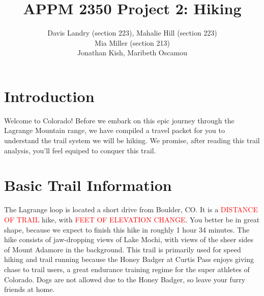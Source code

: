 \documentclass[12pt]{article}   %
\theoremstyle{definition}
\numberwithin{equation}{section}
\begin{document}
\parskip10pt
\parindent0pt
\baselineskip15pt
\doublespacing

\title{APPM 2350 Project 2: Hiking}
\author{Davis Landry (section 223), Mahalie Hill (section 223)\\Mia Miller (section 213) \\ Jonathan Kish, Maribeth Oscamou}

\pagestyle{fancy}
\renewcommand{\sectionmark}[1]{\markright{#1}{}}

\fancyhf{}

\rhead{\fancyplain{}{\thepage}} %
\lhead{\fancyplain{}{\rightmark }} %

\maketitle
\newpage
\tableofcontents
\newpage
\newpage
\lhead{]Landry, Hill, Miller Project 1}

\section{Introduction} \label{APPM2350proj01sec01}

\quad Welcome to Colorado! Before we embark on this epic journey through the Lagrange Mountain range, we have compiled a travel packet for you to understand the trail system we will be hiking. We promise, after reading this trail analysis, you'll feel equiped to conquer this trail.

\section{Basic Trail Information} \label{APPM2350proj01sec02}

\quad The Lagrange loop is located a short drive from Boulder, CO. It is a \textcolor{red}{DISTANCE OF TRAIL} hike, with \textcolor{red}{FEET OF ELEVATION CHANGE}. You better be in great shape, because we expect to finish this hike in roughly 1 hour 34 minutes. The hike consists of jaw-dropping views of Lake Mochi, with views of the sheer sides of Mount Adamore in the background. This trail is primarily used for speed hiking and trail running because the Honey Badger at Curtis Pass enjoys giving chase to trail users, a great endurance training regime for the super athletes of Colorado. Dogs are not allowed due to the Honey Badger, so leave your furry friends at home.
\end{document}
